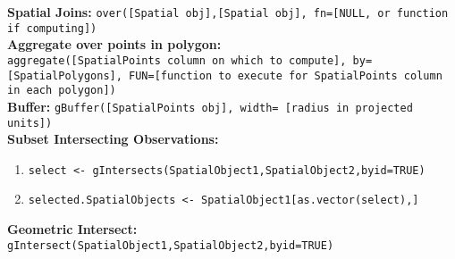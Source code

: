 \documentclass[10pt]{article}
\begin{document}
\textbf{Spatial Joins:} \texttt{over([Spatial obj],[Spatial obj], fn=[NULL, or function if computing])}\\
\textbf{Aggregate over points in polygon:} \\
\texttt{aggregate([SpatialPoints column on which to compute], by=[SpatialPolygons], FUN=[function to execute for SpatialPoints column in each polygon])}\\
\textbf{Buffer:} \texttt{gBuffer([SpatialPoints obj], width= [radius in projected units])}\\
\textbf{Subset Intersecting Observations:}
\begin{enumerate}
	\item \texttt{select <- gIntersects(SpatialObject1,SpatialObject2,byid=TRUE)} 
	\item \texttt{selected.SpatialObjects <- SpatialObject1[as.vector(select),]}
\end{enumerate} 
\textbf{Geometric Intersect:} \texttt{gIntersect(SpatialObject1,SpatialObject2,byid=TRUE)}


\hrulefill 	
\end{document}
